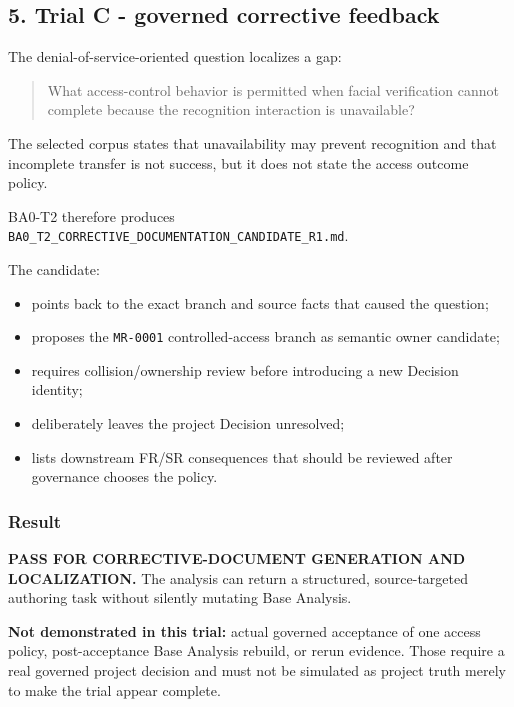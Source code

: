 \documentclass[
  10pt,
  a4paper,
]{article}
\providecommand{\tightlist}{%
  \setlength{\itemsep}{0pt}\setlength{\parskip}{0pt}}
\begin{document}
\subsection{5. Trial C - governed corrective
feedback}\label{5-trial-c---governed-corrective-feedback}

The denial-of-service-oriented question localizes a gap:

\begin{quote}
What access-control behavior is permitted when facial verification
cannot complete because the recognition interaction is unavailable?
\end{quote}

The selected corpus states that unavailability may prevent recognition
and that incomplete transfer is not success, but it does not state the
access outcome policy.

BA0-T2 therefore produces
\texttt{BA0\_T2\_CORRECTIVE\_DOCUMENTATION\_CANDIDATE\_R1.md}.

The candidate:

\begin{itemize}
\tightlist
\item
  points back to the exact branch and source facts that caused the
  question;
\item
  proposes the \texttt{MR-0001} controlled-access branch as semantic
  owner candidate;
\item
  requires collision/ownership review before introducing a new Decision
  identity;
\item
  deliberately leaves the project Decision unresolved;
\item
  lists downstream FR/SR consequences that should be reviewed after
  governance chooses the policy.
\end{itemize}

\subsubsection{Result}\label{result}

\textbf{PASS FOR CORRECTIVE-DOCUMENT GENERATION AND LOCALIZATION.} The
analysis can return a structured, source-targeted authoring task without
silently mutating Base Analysis.

\textbf{Not demonstrated in this trial:} actual governed acceptance of
one access policy, post-acceptance Base Analysis rebuild, or rerun
evidence. Those require a real governed project decision and must not be
simulated as project truth merely to make the trial appear complete.
\end{document}
